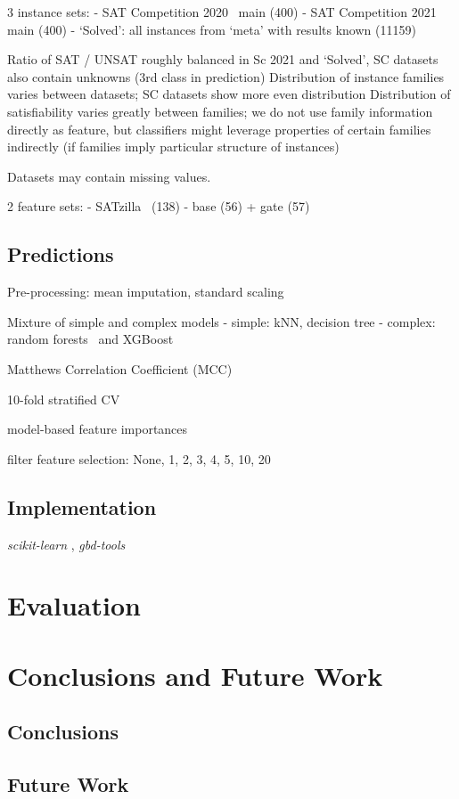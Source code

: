 \documentclass{article}
\begin{document}
3 instance sets:
- SAT Competition 2020~\cite{balyo2020proceedings} main (400)
- SAT Competition 2021~\cite{balyo2021proceedings} main (400)
- `Solved': all instances from `meta' with results known (11159)

Ratio of SAT / UNSAT roughly balanced in Sc 2021 and `Solved', SC datasets also contain unknowns (3rd class in prediction)
Distribution of instance families varies between datasets; SC datasets show more even distribution
Distribution of satisfiability varies greatly between families; we do not use family information directly as feature, but classifiers might leverage properties of certain families indirectly (if families imply particular structure of instances)

Datasets may contain missing values.

2 feature sets:
- SATzilla~\cite{xu2012features} (138)
- base (56) + gate (57)

\subsection{Predictions}

Pre-processing: mean imputation, standard scaling

Mixture of simple and complex models
- simple: kNN, decision tree
- complex: random forests~\cite{breiman2001random} and XGBoost~\cite{chen2016xgboost}

Matthews Correlation Coefficient (MCC)~\cite{matthews1975comparison, gorodkin2004comparing}

10-fold stratified CV

model-based feature importances

filter feature selection: None, 1, 2, 3, 4, 5, 10, 20

\subsection{Implementation}

\emph{scikit-learn} \cite{pedregosa2011scikit}, \emph{gbd-tools}~\cite{iser2020collaborative}

\section{Evaluation}
\label{sec:evaluation}

\section{Conclusions and Future Work}
\label{sec:conclusion}

\subsection{Conclusions}

\subsection{Future Work}

\printbibliography
\end{document}
